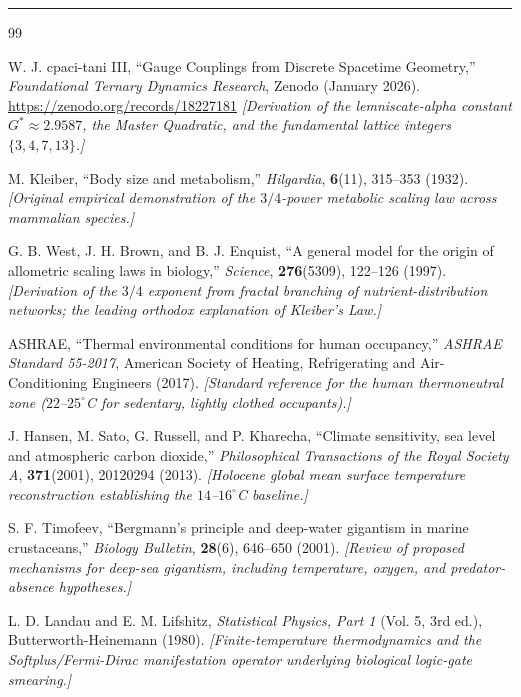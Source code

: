 \documentclass[11pt, letterpaper]{article}
\newcommand{\G}{G^*}
\theoremstyle{definition}
\theoremstyle{remark}
\begin{document}
\vspace{2em}
\hrule
\vspace{1.5em}

\begin{thebibliography}{99}

W. J. cpaci-tani III,
``Gauge Couplings from Discrete Spacetime Geometry,''
\textit{Foundational Ternary Dynamics Research}, Zenodo (January 2026).
\url{https://zenodo.org/records/18227181}
\newblock \textit{[Derivation of the lemniscate-alpha constant $\G \approx 2.9587$, the Master Quadratic, and the fundamental lattice integers $\{3, 4, 7, 13\}$.]}

M. Kleiber,
``Body size and metabolism,''
\textit{Hilgardia}, \textbf{6}(11), 315--353 (1932).
\newblock \textit{[Original empirical demonstration of the $3/4$-power metabolic scaling law across mammalian species.]}

G. B. West, J. H. Brown, and B. J. Enquist,
``A general model for the origin of allometric scaling laws in biology,''
\textit{Science}, \textbf{276}(5309), 122--126 (1997).
\newblock \textit{[Derivation of the $3/4$ exponent from fractal branching of nutrient-distribution networks; the leading orthodox explanation of Kleiber's Law.]}

ASHRAE,
``Thermal environmental conditions for human occupancy,''
\textit{ASHRAE Standard 55-2017}, American Society of Heating, Refrigerating and Air-Conditioning Engineers (2017).
\newblock \textit{[Standard reference for the human thermoneutral zone ($22$--$25^\circ$C for sedentary, lightly clothed occupants).]}

J. Hansen, M. Sato, G. Russell, and P. Kharecha,
``Climate sensitivity, sea level and atmospheric carbon dioxide,''
\textit{Philosophical Transactions of the Royal Society A}, \textbf{371}(2001), 20120294 (2013).
\newblock \textit{[Holocene global mean surface temperature reconstruction establishing the $14$--$16^\circ$C baseline.]}

S. F. Timofeev,
``Bergmann's principle and deep-water gigantism in marine crustaceans,''
\textit{Biology Bulletin}, \textbf{28}(6), 646--650 (2001).
\newblock \textit{[Review of proposed mechanisms for deep-sea gigantism, including temperature, oxygen, and predator-absence hypotheses.]}

L. D. Landau and E. M. Lifshitz,
\textit{Statistical Physics, Part 1} (Vol. 5, 3rd ed.), Butterworth-Heinemann (1980).
\newblock \textit{[Finite-temperature thermodynamics and the Softplus/Fermi-Dirac manifestation operator underlying biological logic-gate smearing.]}

\end{thebibliography}
\end{document}
